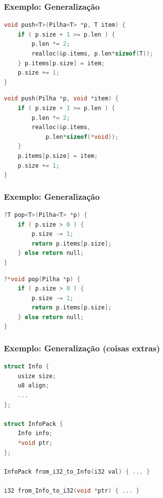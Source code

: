 \documentclass{beamer}
\begin{document}
\begin{frame}[fragile]
    \frametitle{Exemplo: Generalização}
    \begin{lstlisting}[language=C]
void push<T>(Pilha<T> *p, T item) {
    if ( p.size + 1 >= p.len ) {
        p.len *= 2;
        realloc(&p.items, p.len*sizeof(T));
    } p.items[p.size] = item;
    p.size += 1;
}
    \end{lstlisting}
    \vfill
    \begin{lstlisting}[language=C]
void push(Pilha *p, void *item) {
    if ( p.size + 1 >= p.len ) {
        p.len *= 2;
        realloc(&p.items,
            p.len*sizeof(*void));
    }
    p.items[p.size] = item;
    p.size += 1;
}
    \end{lstlisting}
\end{frame}

\begin{frame}[fragile]
    \frametitle{Exemplo: Generalização}
    \begin{lstlisting}[language=C]
?T pop<T>(Pilha<T> *p) {
    if ( p.size > 0 ) {
        p.size -= 1;
        return p.items[p.size];
    } else return null;
}
    \end{lstlisting}
    \vfill
    \begin{lstlisting}[language=C]
?*void pop(Pilha *p) {
    if ( p.size > 0 ) {
        p.size -= 1;
        return p.items[p.size];
    } else return null;
}
    \end{lstlisting}
\end{frame}

\begin{frame}[fragile]
    \frametitle{Exemplo: Generalização (coisas extras)}
    \begin{lstlisting}[language=C]
struct Info {
    usize size;
    u8 align;
    ...
};

struct InfoPack {
    Info info;
    *void ptr;
};

InfoPack from_i32_to_Info(i32 val) { ... }

i32 from_Info_to_i32(void *ptr) { ... }
    \end{lstlisting}
\end{frame}
\end{document}
